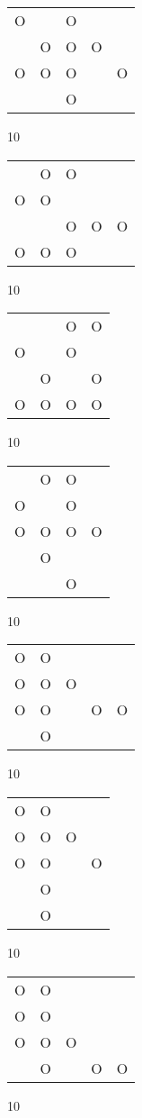 \begin{tabular}{|m{0.2cm}m{0.2cm}m{0.2cm}m{0.2cm}m{0.2cm}|}\hline
O& &O& & \\
 &O&O&O& \\
O&O&O& &O\\
 & &O& & \\
\hline\end{tabular}10
\begin{tabular}{|m{0.2cm}m{0.2cm}m{0.2cm}m{0.2cm}m{0.2cm}|}\hline
 &O&O& & \\
O&O& & & \\
 & &O&O&O\\
O&O&O& & \\
\hline\end{tabular}10
\begin{tabular}{|m{0.2cm}m{0.2cm}m{0.2cm}m{0.2cm}|}\hline
 & &O&O\\
O& &O& \\
 &O& &O\\
O&O&O&O\\
\hline\end{tabular}10
\begin{tabular}{|m{0.2cm}m{0.2cm}m{0.2cm}m{0.2cm}|}\hline
 &O&O& \\
O& &O& \\
O&O&O&O\\
 &O& & \\
 & &O& \\
\hline\end{tabular}10
\begin{tabular}{|m{0.2cm}m{0.2cm}m{0.2cm}m{0.2cm}m{0.2cm}|}\hline
O&O& & & \\
O&O&O& & \\
O&O& &O&O\\
 &O& & & \\
\hline\end{tabular}10
\begin{tabular}{|m{0.2cm}m{0.2cm}m{0.2cm}m{0.2cm}|}\hline
O&O& & \\
O&O&O& \\
O&O& &O\\
 &O& & \\
 &O& & \\
\hline\end{tabular}10
\begin{tabular}{|m{0.2cm}m{0.2cm}m{0.2cm}m{0.2cm}m{0.2cm}|}\hline
O&O& & & \\
O&O& & & \\
O&O&O& & \\
 &O& &O&O\\
\hline\end{tabular}10
